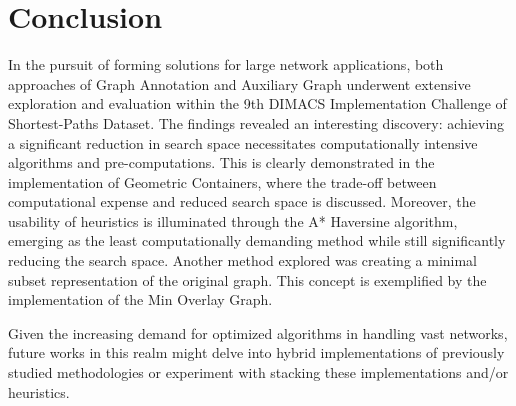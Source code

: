 \documentclass{article}
\begin{document}
\section{Conclusion}

In the pursuit of forming solutions for large network applications, both approaches of Graph Annotation and Auxiliary Graph underwent extensive exploration and evaluation within the 9th DIMACS Implementation Challenge of Shortest-Paths Dataset. The findings revealed an interesting discovery: achieving a significant reduction in search space necessitates computationally intensive algorithms and pre-computations. This is clearly demonstrated in the implementation of Geometric Containers, where the trade-off between computational expense and reduced search space is discussed. Moreover, the usability of heuristics is illuminated through the A* Haversine algorithm, emerging as the least computationally demanding method while still significantly reducing the search space. Another method explored was creating a minimal subset representation of the original graph. This concept is exemplified by the implementation of the Min Overlay Graph.

Given the increasing demand for optimized algorithms in handling vast networks, future works in this realm might delve into hybrid implementations of previously studied methodologies or experiment with stacking these implementations and/or heuristics.

\end{document}
